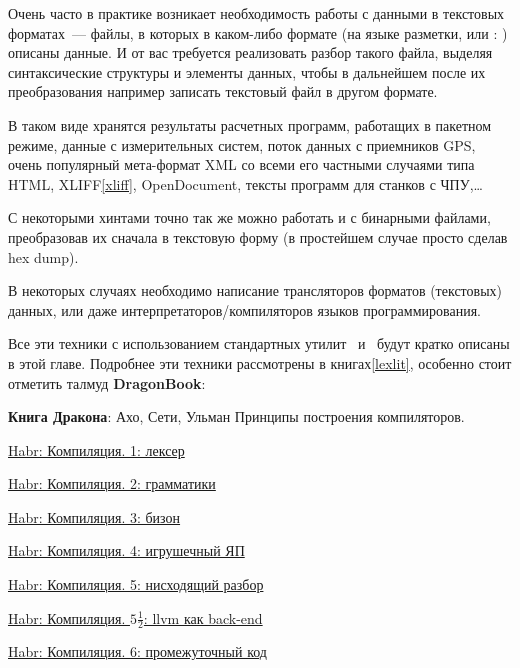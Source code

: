 \secdown

Очень часто в практике возникает необходимость работы с данными в текстовых
форматах\ ---  файлы, в которых в каком-либо
формате (на языке разметки, или : ) описаны данные. И от вас
требуется реализовать разбор такого файла, выделяя синтаксические структуры и
элементы данных, чтобы в дальнейшем после их преобразования например записать
текстовый файл в другом формате.

В таком виде хранятся результаты расчетных программ, работащих в пакетном
режиме, данные с измерительных систем, поток данных с приемников
GPS, очень популярный мета-формат XML со всеми его
частными случаями типа HTML, XLIFF\ref{xliff}, OpenDocument, тексты программ
для станков с ЧПУ,\ldots

С некоторыми хинтами точно так же можно работать и с бинарными файлами,
преобразовав их сначала в текстовую форму (в простейшем случае просто сделав hex
dump).

В некоторых случаях необходимо написание трансляторов форматов (текстовых)
данных, или даже интерпретаторов/компиляторов языков программирования.

\bigskip
Все эти техники с использованием стандартных утилит \ и \
будут кратко описаны в этой главе. Подробнее эти техники рассмотрены в
книгах\ref{lexlit}, особенно стоит отметить талмуд
\textbf{DragonBook}:

\bigskip

\label{exdragon}\cite{dragonbook} \textbf{Книга Дракона}: Ахо, Сети, Ульман
Принципы построения компиляторов.

\bigskip

\href{http://habrahabr.ru/post/99162/}{Habr: Компиляция. 1: лексер}

\href{http://habrahabr.ru/post/99298/}{Habr: Компиляция. 2: грамматики}

\href{http://habrahabr.ru/post/99366/}{Habr: Компиляция. 3: бизон}

\href{http://habrahabr.ru/post/99397/}{Habr: Компиляция. 4: игрушечный ЯП}

\href{http://habrahabr.ru/post/99466/}{Habr: Компиляция. 5: нисходящий разбор}

\href{http://habrahabr.ru/post/102597/}{Habr: Компиляция. $5\frac{1}{2}$: llvm
как back-end}

\href{http://habrahabr.ru/post/99592/}{Habr: Компиляция. 6: промежуточный код}


